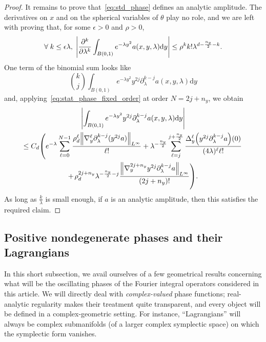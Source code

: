 \documentclass[10pt]{amsart}
\theoremstyle{definition}\newtheorem{defi}[theo]{Definition}\newtheorem{rema}[theo]{Remark}\newtheorem{exam}[theo]{Example}\newtheorem{exem}[theo]{Example}\newtheorem{nota}[theo]{Notation}
\newcommand\1{\mathds{1}}
\newcommand{\dd}{\mathrm{d}}
\let\oldforall\forall
\renewcommand*{\forall}{\mathrel{\oldforall}}
\let\originalleft\left
\let\originalright\right
\renewcommand{\left}{\mathopen{}\mathclose\bgroup\originalleft}
\renewcommand{\right}{\aftergroup\egroup\originalright}
\begin{document}
\begin{proof}
It remains to prove that~\eqref{eq:std_phase} defines an analytic amplitude. The derivatives on $x$ and on the spherical variables of $\theta$ play no role, and we are left with proving that, for some $\epsilon>0$ and $\rho>0$,
\[
\forall k\leq \epsilon \lambda,\;\left|\frac{\partial^k}{\partial
\lambda^k}\int_{B(0,1)}e^{-\lambda y^2}a(x,y,\lambda)\dd y
\right|\leq \rho^{k}k!\lambda^{d-\frac{n_y}{2}-k}.
\]
One term of the binomial sum looks like
\[
\binom{k}{j}\int_{B(0,1)}e^{-\lambda y^2}y^{2j}\partial_\lambda^{k-j}a(x,y,\lambda)\dd y
\]
and, applying~\eqref{eq:stat_phase_fixed_order} at order $N=2j+n_y$, we obtain
\begin{multline*}
\left|\int_{B(0,1)}e^{-\lambda y^2}y^{2j}\partial_\lambda^{k-j}a(x,y,\lambda)\dd y\right|\\ \leq C_d\left(e^{-\lambda}\sum_{\ell=0}^{N-1}\frac{\rho_d^\ell\left\|\nabla^\ell_y\partial^{k-j}_{\lambda}(y^{2j}a)\right\|_{L^{\infty}}}{\ell!}+\lambda^{-\frac{n_y}{2}}\sum_{\ell=j}^{j+\frac{n_y}{2}}\frac{\Delta^\ell_y\left(y^{2j}\partial_{\lambda}^{k-j}a\right)(0)}{(4\lambda)^\ell \ell!}\right.\\
+\left.\rho_d^{2j+n_y}\lambda^{-\frac{n_y}{2}-j}\frac{\left\|\nabla^{2j+n_y}_yy^{2j}\partial^{k-j}_{\lambda}a\right\|_{L^{\infty}}}{(2j+n_y)!}\right).
\end{multline*}
As long as $\frac{k}{\lambda}$ is small enough, if $a$ is an analytic amplitude, then this satisfies the required claim.
\end{proof}


\subsection{Positive nondegenerate phases and their Lagrangians}\label{sec:posit-nond-phas}

In this short subsection, we avail ourselves of a few geometrical results concerning what will be the oscillating phases of the Fourier {integral operators} considered in this article. We will directly deal with \emph{complex-valued} phase functions; real-analytic regularity makes their treatment quite transparent, and every object will be defined in a complex-geometric setting. For instance, ``Lagrangians'' will always be complex submanifolds (of a larger complex symplectic space) on which the symplectic form vanishes.
\end{document}
